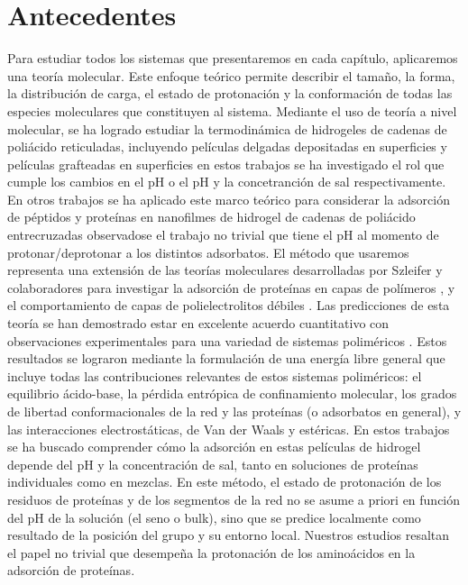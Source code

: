 
\chapter{Antecedentes} %

\label{Chapter-film} %

Para estudiar todos los sistemas que presentaremos en cada cap\'itulo, aplicaremos una teor\'ia molecular.
Este enfoque te\'orico permite describir el tama\~no, la forma, la distribuci\'on de carga, el estado de protonaci\'on y la conformaci\'on de todas las especies moleculares que constituyen al sistema. 
Mediante el uso de teor\'ia a nivel molecular, se ha logrado estudiar la termodin\'amica de hidrogeles de cadenas de poli\'acido reticuladas, incluyendo pel\'iculas delgadas depositadas en superficies \cite{longo2012molecular} y pel\'iculas grafteadas en superficies \cite{longo2014non} en estos trabajos se ha investigado el rol que cumple los cambios en el pH o el pH y la concetranci\'on de sal respectivamente. En otros trabajos se ha aplicado este marco te\'orico para considerar la adsorci\'on de p\'eptidos y prote\'inas en nanofilmes de hidrogel de cadenas de poli\'acido entrecruzadas \cite{longo2014equilibrium,narambuena2015lysozyme,longo2016adsorption} observadose el trabajo no trivial que tiene el pH al momento de protonar/deprotonar a los distintos adsorbatos. El m\'etodo que usaremos representa una extensi\'on de las teor\'ias moleculares desarrolladas por Szleifer y colaboradores para investigar la adsorci\'on de prote\'inas en capas de pol\'imeros \cite{hagemann2018use,szleifer1997protein,fang2005kinetics}, y el comportamiento de capas de polielectrolitos d\'ebiles \cite{nap2006weak}. Las predicciones de esta teor\'ia se han demostrado estar en excelente acuerdo cuantitativo con observaciones experimentales para una variedad de sistemas polim\'ericos \cite{tagliazucchi2010responsive,wu2007behavior}.
Estos resultados se lograron mediante la formulaci\'on de una energ\'ia libre general que incluye todas las contribuciones relevantes de estos sistemas polim\'ericos: el equilibrio \'acido-base, la p\'erdida entr\'opica de confinamiento molecular, los grados de libertad conformacionales de la red y las prote\'inas (o adsorbatos en general), y las interacciones electrost\'aticas, de Van der Waals y est\'ericas. En estos trabajos se ha buscado comprender c\'omo la adsorci\'on en estas pel\'iculas de hidrogel depende del pH y la concentraci\'on de sal, tanto en soluciones de prote\'inas individuales como en mezclas. En este m\'etodo, el estado de protonaci\'on de los residuos de prote\'inas y de los segmentos de la red no se asume a priori en funci\'on del pH de la soluci\'on (el seno o bulk), sino que se predice localmente como resultado de la posici\'on del grupo y su entorno local. Nuestros estudios resaltan el papel no trivial que desempe\~na la protonaci\'on de los amino\'acidos en la adsorci\'on de prote\'inas. 

